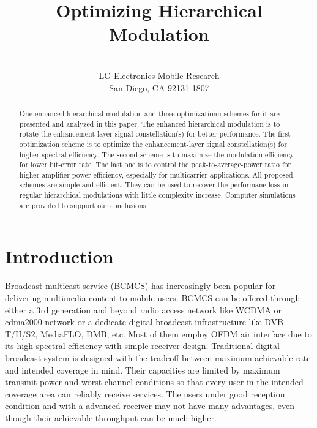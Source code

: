 \documentclass[10pt,fleqn, twocolumn]{IEEEtran}
\title{Optimizing Hierarchical Modulation}
\author{\\LG Electronics Mobile Research\\San Diego, CA 92131-1807}
\date{}
\begin{document}
\maketitle
\begin{abstract}\small
One enhanced hierarchical modulation and three optimizationn
schemes for it are presented and analyzed in this paper. The
enhanced hierarchical modulation is to rotate the
enhancement-layer signal constellation(s) for better performance.
The first optimization scheme is to optimize the enhancement-layer
signal constellation(s) for higher spectral efficiency. The second
scheme is to maximize the modulation efficiency for lower
bit-error rate. The last one is to control the
peak-to-average-power ratio for higher amplifier power efficiency,
especially for multicarrier applications. All proposed schemes are
simple and efficient. They can be used to recover the performane
loss in regular hierarchical modulations with little complexity
increase. Computer simulations are provided to support our
conclusions.
\end{abstract}

\section{Introduction}
Broadcast multicast service (BCMCS) has increasingly been popular
for delivering multimedia content to mobile users. BCMCS can be
offered through either a 3rd generation and beyond radio access
network like WCDMA or cdma2000 network or a dedicate digital
broadcast infrastructure like DVB-T/H/S2, MediaFLO, DMB, etc. Most
of them employ OFDM air interface due to its high spectral
efficiency with simple receiver design. Traditional digital
broadcast system is designed with the tradeoff between maximum
achievable rate and intended coverage in mind. Their capacities
are limited by maximum transmit power and worst channel conditions
so that every user in the intended coverage area can reliably
receive services. The users under good reception condition and
with a advanced receiver may not have many advantages, even though
their achievable throughput can be much higher.
\end{document}
